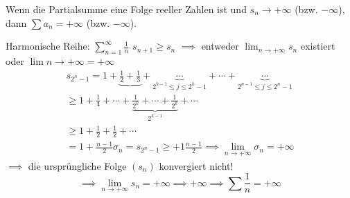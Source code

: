 \begin{Bem}
  Wenn die Partialsumme eine Folge reeller Zahlen ist und $s_n\to+\infty$ (bzw. $-\infty$), dann $\sum a_n=+\infty$ (bzw. $-\infty$).
\end{Bem}
\begin{Bsp}
  Harmonische Reihe: $\sum^\infty_{n=1}\frac{1}{n}$ $s_{n+1}\geq s_n$ $\implies$ entweder $\lim_{n\to+\infty}s_n$ existiert oder $\lim{n\to+\infty}=+\infty$
  \begin{align*}
    s_{2^n-1}=1+\underbrace{\frac{1}{2}+\frac{1}{3}}+\underbrace{\cdots}_{2^{k-1}\leq j\leq 2^k-1}+\cdots+\underbrace{\cdots}_{2^{n-1}\leq j\leq 2^n-1}\\
    \geq 1+\frac{1}{4}+\cdots+\underbrace{\frac{1}{2^k}+\cdots+\frac{1}{2^k}}_{2^{k-1}}+\cdots\\
    \geq 1+\frac{1}{2}+\frac{1}{2}+ \cdots\\
    =1+\frac{n-1}{2}
    \sigma_n=s_{2^n-1}\geq +1\frac{n-1}{2}\implies\lim_{n\to+\infty}\sigma_n=+\infty
  \end{align*}
  $\implies$ die ursprüngliche Folge $(s_n)$ konvergiert nicht! 
  \[\implies \lim_{n\to+\infty}s_n=+\infty\implies+\infty \implies \sum\frac{1}{n}=+\infty\]
\end{Bsp}
